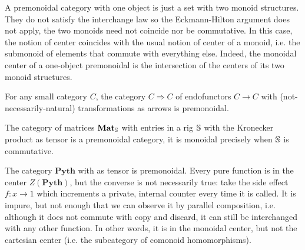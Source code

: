 \begin{example}
A premonoidal category with one object is just a set with two monoid structures.
They do not satisfy the interchange law so the Eckmann-Hilton argument does not apply, the two monoids need not coincide nor be commutative.
In this case, the notion of center coincides with the usual notion of center of a monoid, i.e. the submonoid of elements that commute with everything else.
Indeed, the monoidal center of a one-object premonoidal is the intersection of the centers of its two monoid structures.
\end{example}

\begin{example}
For any small category $C$, the category $C \Rightarrow C$ of endofunctors $C \to C$ with (not-necessarily-natural) transformations as arrows is premonoidal.
\end{example}

\begin{example}
The category of matrices $\mathbf{Mat}_\S$ with entries in a rig $\S$ with the Kronecker product as tensor is a premonoidal category, it is monoidal precisely when $\S$ is commutative.
\end{example}

\begin{example}
The category $\mathbf{Pyth}$ with  as tensor is premonoidal.
Every pure function is in the center $Z(\mathbf{Pyth})$, but the converse is not necessarily true: take the side effect $f : x \to 1$ which increments a private, internal counter every time it is called.
It is impure, but not enough that we can observe it by parallel composition, i.e. although it does not commute with copy and discard, it can still be interchanged with any other function.
In other words, it is in the monoidal center, but not the cartesian center (i.e. the subcategory of comonoid homomorphisms).
\end{example}

